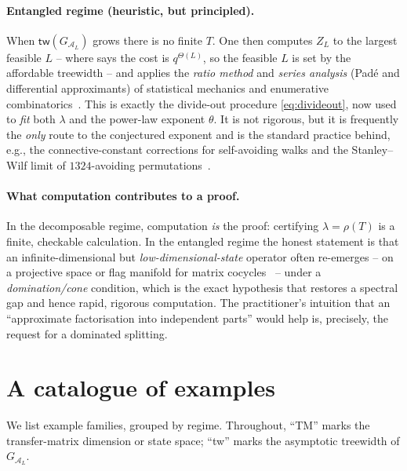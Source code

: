 \documentclass[11pt]{article}
\newcommand{\calA}{\mathcal{A}}
\newcommand{\tw}{\mathsf{tw}}
\newcommand{\treewidthp}[1]{\tw(#1)}
\newcommand{\graphform}[1]{G_{#1}}
\theoremstyle{plain}
\theoremstyle{definition}
\theoremstyle{remark}
\begin{document}
\paragraph{Entangled regime (heuristic, but principled).}
When $\treewidthp{\graphform{\calA_L}}$ grows there is no finite $T$. One then
computes $Z_L$ to the largest feasible $L$ -- where  says the cost
is $q^{\Theta(L)}$, so the feasible $L$ is set by the affordable treewidth -- and
applies the \emph{ratio method} and \emph{series analysis} (Padé and differential
approximants) of statistical mechanics and enumerative
combinatorics~\citep{guttmann2009polygons,jensen2004enumeration}. This is exactly
the divide-out procedure \eqref{eq:divideout}, now used to \emph{fit} both $\lambda$
and the power-law exponent $\theta$. It is not rigorous, but it is frequently the
\emph{only} route to the conjectured exponent and is the standard practice behind,
e.g., the connective-constant corrections for self-avoiding walks and the
Stanley--Wilf limit of $1324$-avoiding permutations~\citep{conway2018ts}.

\paragraph{What computation contributes to a proof.}
In the decomposable regime, computation \emph{is} the proof: certifying
$\lambda=\rho(T)$ is a finite, checkable calculation. In the entangled regime the
honest statement is that an infinite-dimensional but \emph{low-dimensional-state}
operator often re-emerges -- on a projective space or flag manifold for matrix
cocycles~\citep{falconer1988hausdorff,kaenmaki2004natural,morris2018matrix,
barany2019hausdorff} -- under a \emph{domination/cone} condition, which is the exact
hypothesis that restores a spectral gap and hence rapid, rigorous computation. The
practitioner's intuition that an ``approximate factorisation into independent
parts'' would help is, precisely, the request for a dominated splitting.

\section{A catalogue of examples}
\label{sec:catalogue}

We list example families, grouped by regime. Throughout, ``\textsf{TM}'' marks the
transfer-matrix dimension or state space; ``\textsf{tw}'' marks the asymptotic
treewidth of $\graphform{\calA_L}$.
\end{document}
